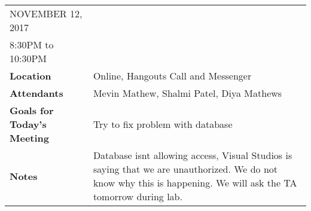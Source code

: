 \documentclass{article}
\begin{document}
\begin{table}[hp]
\begin{tabularx}{\textwidth}{lX}
\toprule
NOVEMBER 12, 2017\\
8:30PM to 10:30PM\\
\midrule
\textbf{Location} & Online, Hangouts Call and Messenger\\
\textbf{Attendants} & Mevin Mathew, Shalmi Patel, Diya Mathews\\
\midrule
\textbf{Goals for Today's Meeting} & Try to fix problem with database\\
\midrule
\textbf{Notes} & Database isnt allowing access, Visual Studios is saying that we are unauthorized. We do not know why this is happening. We will ask the TA tomorrow during lab.\\
\bottomrule
\end{tabularx}
\end{table}
\end{document}
